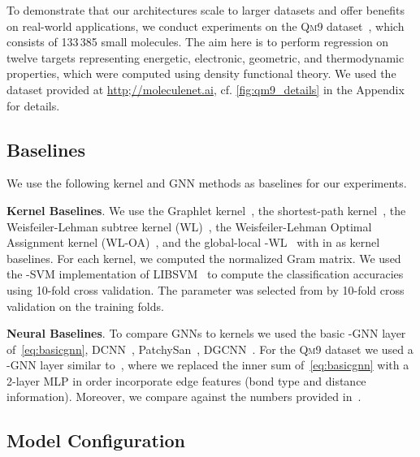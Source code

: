 \documentclass[letterpaper]{article}
\theoremstyle{definition}
\newcommand{\xhdr}[1]{{\noindent\bfseries #1}.}
\begin{document}
To demonstrate that our architectures scale to larger datasets and offer benefits on real-world applications, we conduct experiments on the \textsc{Qm9} dataset~\cite{Ram+2014,Rud+2012,Wu+2018}, which consists of 133\,385 small molecules. The aim here is to perform regression on twelve targets representing energetic, electronic, geometric, and thermodynamic properties, which were computed using density functional theory. We used the dataset provided at \url{http;//moleculenet.ai}, cf. \cref{fig:qm9_details} in the Appendix for details. 


\subsection{Baselines}

We use the following kernel and GNN methods as baselines for our experiments.

\xhdr{Kernel Baselines} We use the Graphlet kernel~\cite{She+2009}, the shortest-path kernel~\cite{Borgwardt2005}, the Weisfeiler-Lehman subtree kernel (\textsc{WL})~\cite{She+2011}, the Weisfeiler-Lehman Optimal Assignment kernel (\textsc{WL-OA})~\cite{Kri+2016}, and the global-local -WL~\cite{Mor+2017} with  in  as kernel baselines. 
For each kernel, we computed the normalized Gram matrix. 
We used the -SVM implementation of LIBSVM~\cite{Cha+2011} to compute the classification accuracies using 10-fold cross validation. 
The parameter  was selected from   by 10-fold cross validation on the training folds. 

\xhdr{Neural Baselines} To compare GNNs to kernels we used the basic -GNN layer of~\cref{eq:basicgnn}, DCNN~\cite{Wang2018}, PatchySan~\cite{Nie+2016}, DGCNN~\cite{Zha+2018}. For the \textsc{Qm9} dataset we used a -GNN layer similar to~\cite{Gil+2017}, where we replaced the inner sum of~\cref{eq:basicgnn} with a 2-layer MLP in order incorporate edge features (bond type and distance information). Moreover, we compare against the numbers provided in~\cite{Wu+2018}.

\subsection{Model Configuration}
\end{document}
